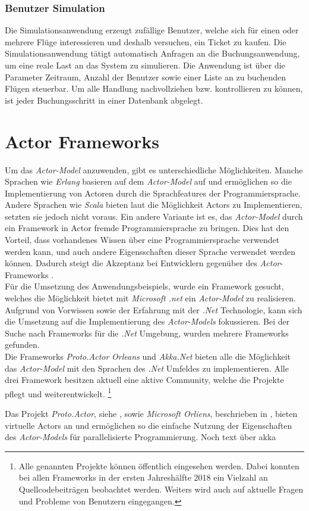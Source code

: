 \subsubsection{Benutzer Simulation}
Die Simulationsanwendung erzeugt zufällige Benutzer, welche sich für einen oder mehrere Flüge interessieren und deshalb versuchen, ein Ticket zu kaufen. Die Simulationsanwendung tätigt automatisch Anfragen an die Buchungsanwendung, um eine reale Last an das System zu simulieren. Die Anwendung ist über die Parameter Zeitraum, Anzahl der Benutzer sowie einer Liste an zu buchenden Flügen steuerbar.  
Um alle Handlung nachvollziehen bzw. kontrollieren zu können, ist jeder Buchungsschritt in einer Datenbank abgelegt.


\section{Actor Frameworks}\label{sec:ActorFrameworks}
Um das \textit{Actor-Model} anzuwenden, gibt es unterschiedliche Möglichkeiten. Manche Sprachen wie \textit{Erlang} basieren auf dem \textit{Actor-Model} auf und ermöglichen so die Implementierung von Actoren \citep{actorComparativeAnalysis} durch die Sprachfeatures der Programmiersprache. Andere Sprachen wie \textit{Scala} bieten laut \cite{haller2012actors} die Möglichkeit Actors zu Implementieren, setzten sie jedoch nicht voraus. Ein andere Variante ist es, das \textit{Actor-Model} durch ein Framework in Actor fremde Programmiersprache zu bringen. Dies hat den Vorteil, dass vorhandenes Wissen über eine Programmiersprache verwendet werden kann, und auch andere Eigensschaften dieser Sprache verwendet werden können. Dadurch steigt die Akzeptanz bei Entwicklern gegenüber des \textit{Actor}-Frameworks \citep{lee2006problem}. \\
Für die Umsetzung des Anwendungsbeispiels, wurde ein Framework gesucht, welches die Möglichkeit bietet mit \textit{Microsoft .net} ein \textit{Actor-Model} zu realisieren. Aufgrund von Vorwissen sowie der Erfahrung mit der \textit{.Net} Technologie, kann sich die Umsetzung auf die Implementierung des \textit{Actor-Models} fokussieren. Bei der Suche nach Frameworks für die \textit{.Net} Umgebung, wurden mehrere Frameworks gefunden. \\
Die Frameworks \textit{Proto.Actor} \textit{Orleans} und \textit{Akka.Net} bieten alle die Möglichkeit das \textit{Actor-Model} mit den Sprachen des \textit{.Net} Umfeldes zu implementieren. Alle drei Framework besitzen aktuell eine aktive Community, welche die Projekte pflegt und weiterentwickelt.
\footnote{Alle genannten Projekte können öffentlich eingesehen werden. Dabei konnten bei allen Frameworks in der ersten Jahreshälfte 2018 ein Vielzahl an Quellcodebeiträgen beobachtet werden. Weiters wird auch auf aktuelle Fragen und Probleme von Benutzern eingegangen.}

Das Projekt \textit{Proto.Actor}, siehe \cite{?}, sowie \textit{Microsoft Orliens}, beschrieben in \cite{?}, bieten virtuelle  Actors an und ermöglichen so die einfache Nutzung der Eigenschaften des \textit{Actor-Models} für parallelisierte Programmierung. Noch text über akka
